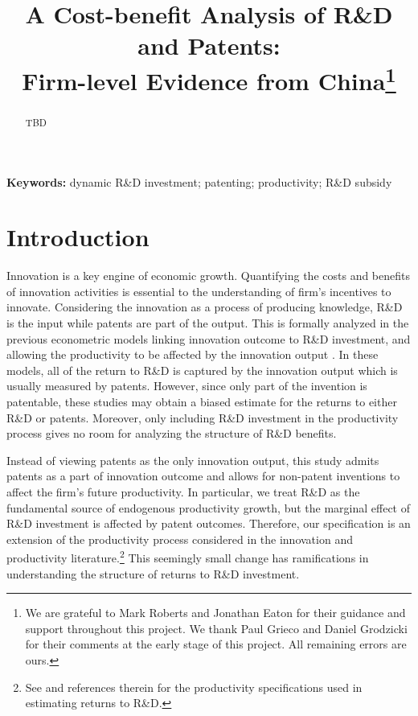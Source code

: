 \documentclass[11pt]{article}
\begin{document}
\title{\Large{}A Cost-benefit Analysis of R\&D and Patents:
\\ Firm-level Evidence from China\footnote{We are grateful to Mark Roberts and Jonathan Eaton for their guidance and support throughout this project. We thank Paul Grieco and Daniel Grodzicki for their comments at the early stage of this project. All remaining errors are ours.}}
\author{}
\maketitle
\begin{abstract}
TBD
\end{abstract}
\textbf{Keywords: }dynamic R\&D investment; patenting; productivity; R\&D subsidy

\newpage

\section{Introduction}

Innovation is a key engine of economic growth. Quantifying the costs and benefits of innovation activities is essential to the understanding of firm's incentives to innovate. Considering the innovation as a process of producing knowledge, R\&D is the input while patents are part of the output. This is formally analyzed in the previous econometric models linking innovation outcome to R\&D investment, and allowing the productivity to be affected by the innovation output \citep{crepon1998research,mairesse2005,raymond2015}. In these models, all of the return to R\&D is captured by the innovation output which is usually measured by patents. However, since only part of the invention is patentable, these studies may obtain a biased estimate for the returns to either R\&D or patents. Moreover, only including R\&D investment in the productivity process gives no room for analyzing the structure of R\&D benefits.

Instead of viewing patents as the only innovation output, this study admits patents as a part of innovation outcome and allows for non-patent inventions to affect the firm's future productivity. In particular, we treat R\&D as the fundamental source of endogenous productivity growth, but the marginal effect of R\&D investment is affected by patent outcomes. Therefore, our specification is an extension of the productivity process considered in the innovation and productivity literature.\footnote{See \cite{hall2010handbook} and references therein for the productivity specifications used in estimating returns to R\&D.} This seemingly small change has ramifications in understanding the structure of returns to R\&D investment. 
\end{document}
